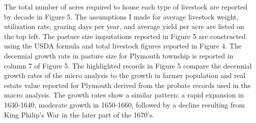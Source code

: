 \documentclass[11pt]{article}
\begin{document}
The total number of acres required to house each type of livestock are reported by decade in Figure 5. The assumptions I made for average livestock weight, utilization rate, grazing days per year, and average yield per acre are listed on the top left. The pasture size imputations reported in Figure 5 are constructed using the USDA formula and total livestock figures reported in Figure 4. The decennial growth rate in pasture size for Plymouth township is reported in column 7 of Figure 5. The highlighted records in Figure 5 compare the decennial growth rates of the micro analysis to the growth in farmer population and real estate value reported for Plymouth derived from the probate records used in the macro analysis. The growth rates show a similar pattern:  a rapid expansion in 1630-1640, moderate growth in 1650-1660, followed by a decline resulting from King Philip's War in the later part of the 1670's.


\end{document}
